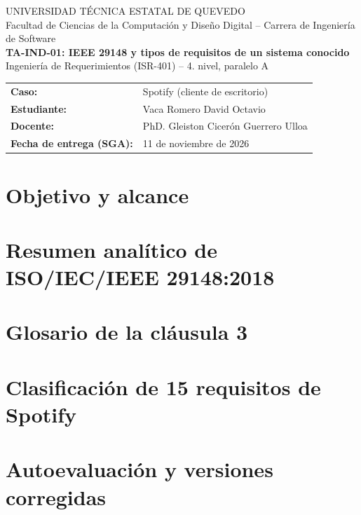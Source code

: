 \documentclass[11pt,a4paper]{article}
\begin{document}
\begin{center}
{\small UNIVERSIDAD TÉCNICA ESTATAL DE QUEVEDO}\\
{\small Facultad de Ciencias de la Computación y Diseño Digital -- Carrera de Ingeniería de Software}\\[5pt]
{\Large\bfseries TA-IND-01: IEEE 29148 y tipos de requisitos de un sistema conocido}\\[3pt]
{\normalsize Ingeniería de Requerimientos (ISR-401) -- 4.\textordmasculine{} nivel, paralelo A}
\end{center}
\begin{tabularx}{\textwidth}{@{}>{\bfseries}lX@{}}
Caso: & Spotify (cliente de escritorio)\\
Estudiante: & Vaca Romero David Octavio\\
Docente: & PhD. Gleiston Cicerón Guerrero Ulloa\\
Fecha de entrega (SGA): & 11 de noviembre de 2026\\
\end{tabularx}

\section{Objetivo y alcance}


\section{Resumen analítico de ISO/IEC/IEEE 29148:2018}


\section{Glosario de la cláusula 3}


\section{Clasificación de 15 requisitos de Spotify}


\section{Autoevaluación y versiones corregidas}

\end{document}
